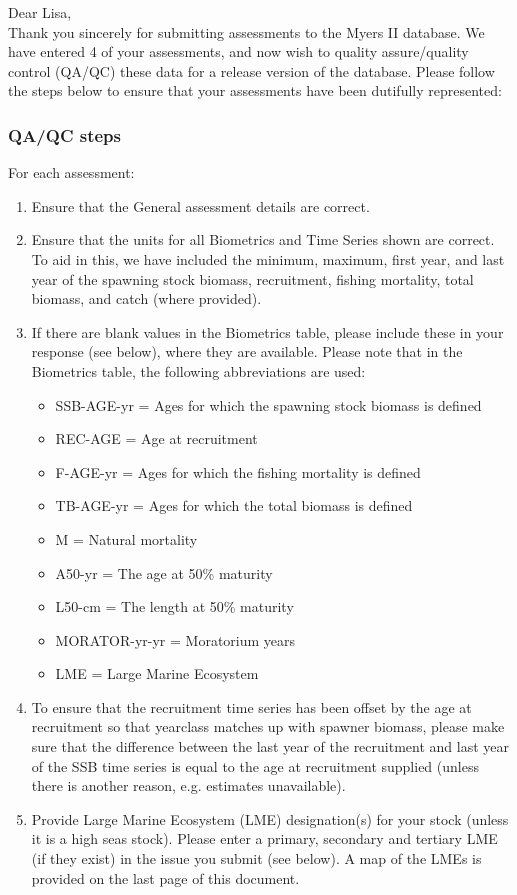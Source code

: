 \documentclass [a4paper, 10pt] {article}
\begin{document}
\noindent Dear Lisa,\\

\noindent Thank you sincerely for submitting assessments to the Myers II database. We have entered 4 of your assessments, and now wish to quality assure/quality control (QA/QC) these data for a release version of the database. Please follow the steps below to ensure that your assessments have been dutifully represented:
\subsubsection{QA/QC steps}
For each assessment:
\begin{enumerate}
\item Ensure that the General assessment details are correct.
\item Ensure that the units for all Biometrics and Time Series shown are correct. To aid in this, we have included the minimum, maximum, first year, and last year of the spawning stock biomass, recruitment, fishing mortality, total biomass, and  catch  (where provided). 
\item If there are blank values in the Biometrics table, please include these in your response (see below), where they are available.
Please note that in the Biometrics table, the following abbreviations are used:
\begin{itemize}
\item SSB-AGE-yr  = Ages for which the spawning stock biomass is defined
\item REC-AGE     = Age at recruitment
\item F-AGE-yr    = Ages for which the fishing mortality is defined 
\item TB-AGE-yr   = Ages for which the total biomass is defined
\item M      = Natural mortality
\item A50-yr      = The age at 50\% maturity
\item L50-cm      = The length at 50\% maturity
\item MORATOR-yr-yr = Moratorium years
\item LME = Large Marine Ecosystem\\
\end{itemize}
\item To ensure that the recruitment time series has been offset by the age at recruitment so that yearclass matches up with spawner biomass, please make sure that the difference between the last year of the recruitment and last year of the SSB time series is equal to the age at recruitment supplied (unless there is another reason, e.g. estimates unavailable). 
\item Provide Large Marine Ecosystem (LME) designation(s) for your stock (unless it is a high seas stock). Please enter a primary, secondary and tertiary LME (if they exist) in the issue you submit (see below). A map of the LMEs is provided on the last page of this document. 
\end{enumerate}
\vspace{-.25in}
\end{document}

